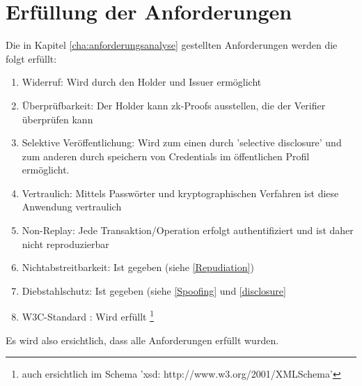 \section{Erfüllung der Anforderungen}
Die in Kapitel \ref{cha:anforderungsanalyse} gestellten Anforderungen werden die folgt erfüllt:
\begin{enumerate}
	\item Widerruf: Wird durch den Holder und Issuer ermöglicht
	\item Überprüfbarkeit: Der Holder kann zk-Proofs ausstellen, die der Verifier überprüfen kann
	
	\item Selektive Veröffentlichung: Wird zum einen durch 'selective disclosure' und zum anderen durch speichern von Credentials im öffentlichen Profil ermöglicht.
	\item Vertraulich: Mittels Passwörter und kryptographischen Verfahren ist diese Anwendung vertraulich
	\item Non-Replay: Jede Transaktion/Operation erfolgt authentifiziert und ist daher nicht reproduzierbar
	\item Nichtabstreitbarkeit: Ist gegeben (siehe \ref{Repudiation})
	\item Diebstahlschutz: Ist gegeben (siehe \ref{Spoofing} und \ref{disclosure}
	\item W3C-Standard : Wird erfüllt \footnote{auch ersichtlich im Schema 'xsd: http://www.w3.org/2001/XMLSchema'}
\end{enumerate}
Es wird also ersichtlich, dass alle Anforderungen erfüllt wurden.

